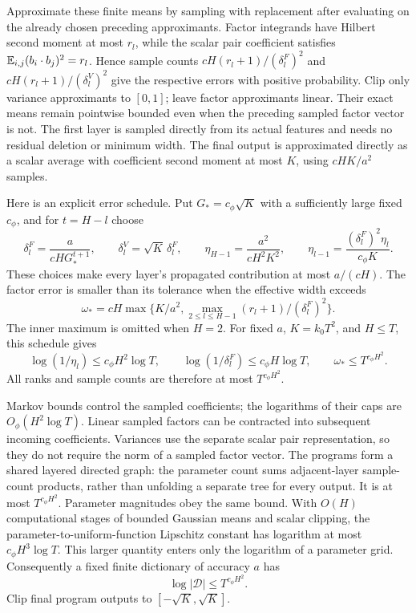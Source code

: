Approximate these finite means by sampling with replacement after evaluating on the already chosen preceding approximants. Factor integrands have Hilbert second moment at most $r_l$, while the scalar pair coefficient satisfies
$\mathbb E_{i,j}(b_i\cdot b_j)^2=r_l$.
Hence sample counts $cH(r_l+1)/(\delta_l^F)^2$ and $cH(r_l+1)/(\delta_l^V)^2$ give the respective errors with positive probability. Clip only variance approximants to $[0,1]$; leave factor approximants linear. Their exact means remain pointwise bounded even when the preceding sampled factor vector is not. The first layer is sampled directly from its actual features and needs no residual deletion or minimum width. The final output is approximated directly as a scalar average with coefficient second moment at most $K$, using $cHK/a^2$ samples.

Here is an explicit error schedule. Put $G_*=c_\phi\sqrt K$ with a sufficiently large fixed $c_\phi$, and for $t=H-l$ choose
\[
 \delta_l^F=\frac{a}{cH G_*^{t+1}},\qquad
 \delta_l^V=\sqrt K\,\delta_l^F,\qquad
 \eta_{H-1}=\frac{a^2}{cH^2K^2},\qquad
 \eta_{l-1}=\frac{(\delta_l^F)^2\eta_l}{c_\phi K}.
\]
These choices make every layer's propagated contribution at most $a/(cH)$. The factor error is smaller than its tolerance when the effective width exceeds
\[
 \omega_* =cH\max\{K/a^2, \max_{2\le l\le H-1}(r_l+1)/(\delta_l^F)^2\}.
\]
The inner maximum is omitted when $H=2$. For fixed $a$, $K=k_0T^2$, and $H\le T$, this schedule gives
\[
 \log(1/\eta_l)\le c_\phi H^2\log T,\qquad
 \log(1/\delta_l^F)\le c_\phi H\log T,\qquad
 \omega_*\le T^{c_\phi H^2}.
\]
All ranks and sample counts are therefore at most $T^{c_\phi H^2}$.

Markov bounds control the sampled coefficients; the logarithms of their caps are $O_\phi(H^2\log T)$. Linear sampled factors can be contracted into subsequent incoming coefficients. Variances use the separate scalar pair representation, so they do not require the norm of a sampled factor vector. The programs form a shared layered directed graph: the parameter count sums adjacent-layer sample-count products, rather than unfolding a separate tree for every output. It is at most $T^{c_\phi H^2}$. Parameter magnitudes obey the same bound. With $O(H)$ computational stages of bounded Gaussian means and scalar clipping, the parameter-to-uniform-function Lipschitz constant has logarithm at most $c_\phi H^3\log T$. This larger quantity enters only the logarithm of a parameter grid. Consequently a fixed finite dictionary of accuracy $a$ has
\begin{equation}
 \log|\mathcal D|\le T^{c_\phi H^2}.
 \label{eq:depth-program-entropy}
\end{equation}
Clip final program outputs to $[-\sqrt K,\sqrt K]$.


